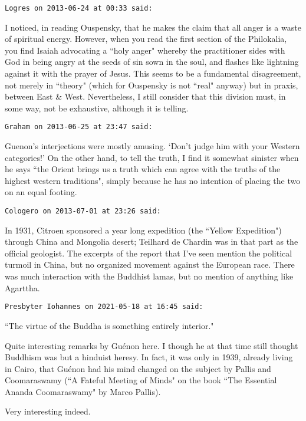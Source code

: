 \begin{footnotesize}
\begin{sffamily}
\hfill

\texttt{Logres on 2013-06-24 at 00:33 said: }

I noticed, in reading Ouspensky, that he makes the claim that all anger is a waste of spiritual energy. However, when you read the first section of the Philokalia, you find Isaiah advocating a ``holy anger" whereby the practitioner sides with God in being angry at the seeds of sin sown in the soul, and flashes like lightning against it with the prayer of Jesus. This seems to be a fundamental disagreement, not merely in ``theory" (which for Ouspensky is not ``real" anyway) but in praxis, between East \& West. Nevertheless, I still consider that this division must, in some way, not be exhaustive, although it is telling.


\hfill

\texttt{Graham on 2013-06-25 at 23:47 said: }

Guenon's interjections were mostly amusing. `Don't judge him with your Western categories!' On the other hand, to tell the truth, I find it somewhat sinister when he says ``the Orient brings us a truth which can agree with the truths of the highest western traditions", simply because he has no intention of placing the two on an equal footing. 


\hfill

\texttt{Cologero on 2013-07-01 at 23:26 said: }

In 1931, Citroen sponsored a year long expedition (the ``Yellow Expedition") through China and Mongolia desert; Teilhard de Chardin was in that part as the official geologist. The excerpts of the report that I've seen mention the political turmoil in China, but no organized movement against the European race. There was much interaction with the Buddhist lamas, but no mention of anything like Agarttha.


\hfill

\texttt{Presbyter Iohannes on 2021-05-18 at 16:45 said: }

``The virtue of the Buddha is something entirely interior."

Quite interesting remarks by Guénon here. I though he at that time still thought Buddhism was but a hinduist heresy. In fact, it was only in 1939, already living in Cairo, that Guénon had his mind changed on the subject by Pallis and Coomaraswamy (``A Fateful Meeting of Minds" on the book ``The Essential Ananda Coomaraswamy" by Marco Pallis).

Very interesting indeed.


\end{sffamily}\end{footnotesize}
